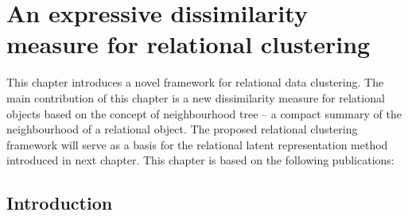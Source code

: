 \chapter{An expressive dissimilarity measure for relational clustering}\label{ch:clustering}


This chapter introduces a novel framework for relational data clustering.
The main contribution of this chapter is a new dissimilarity measure for relational objects based on the concept of neighbourhood tree -- a compact summary of the neighbourhood of a relational object.
The proposed relational clustering framework will serve as a basis for the relational latent representation method introduced in next chapter.
This chapter is based on the following publications:

\begin{quote}
\end{quote}

\begin{quote}
\end{quote}




\section{Introduction}
\label{sec:Intro}




